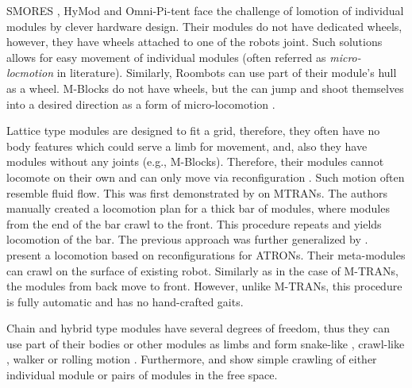 SMORES \cite{DBLP:conf/iros/DaveyKY12}, HyMod \cite{DBLP:conf/dars/ParrottDG16}
and Omni-Pi-tent \cite{DBLP:conf/taros/PeckTT19} face the challenge of lomotion
of individual modules by clever hardware design. Their modules do not have
dedicated wheels, however, they have wheels attached to one of the robots joint.
Such solutions allows for easy movement of individual modules (often referred as
\emph{micro-locmotion} in literature). Similarly, Roombots
\cite{DBLP:conf/icra/SprowitzBDI09} can use part of their module's hull as a
wheel. M-Blocks do not have wheels, but the can jump and shoot themselves into a
desired direction as a form of micro-locomotion
\cite{DBLP:conf/icra/RomanishinGCR15}.

Lattice type modules are designed to fit a grid, therefore, they often have no
body features which could serve a limb for movement, and, also they have modules
without any joints (e.g., M-Blocks). Therefore, their modules cannot locomote on
their own and can only move via reconfiguration \cite{1285597}. Such motion
often resemble fluid flow. This was first demonstrated by
\textcite{DBLP:conf/iros/YoshidaMKTKK01} on MTRANs. The authors manually created
a locomotion plan for a thick bar of modules, where modules from the end of the
bar crawl to the front. This procedure repeats and yields locomotion of the bar.
The previous approach was further generalized by
\textcite{DBLP:conf/icra/ButlerKRT02}.
\textcite{DBLP:conf/ieeealife/Christensen07} present a locomotion based on
reconfigurations for ATRONs. Their meta-modules can crawl on the surface of
existing robot. Similarly as in the case of M-TRANs, the modules from back move
to front. However, unlike M-TRANs, this procedure is fully automatic and has no
hand-crafted gaits.

Chain and hybrid type modules have several degrees of freedom, thus they can use
part of their bodies or other modules as limbs and form snake-like
\cite{DBLP:conf/icra/YimDR00, DBLP:conf/iros/KamimuraMYKTK01,
DBLP:journals/ijrr/KurokawaTKKHM08, DBLP:journals/arobots/JingTYK18}, crawl-like
\cite{DBLP:conf/icra/YimDR00, DBLP:conf/iros/KamimuraMYKTK01,
DBLP:journals/ijrr/KurokawaTKKHM08, DBLP:journals/arobots/JingTYK18}, walker
\cite{DBLP:conf/iros/KamimuraMYKTK01, DBLP:journals/ijrr/KurokawaTKKHM08,
mtranwalker} or rolling motion \cite{DBLP:journals/ijrr/KurokawaTKKHM08,
DBLP:journals/ijrr/SastraCY09, DBLP:journals/arobots/JingTYK18}. Furthermore,
\cite{DBLP:conf/iros/YimSSPDT07a} and \cite{DBLP:journals/ijrr/KurokawaTKKHM08}
show simple crawling of either individual module or pairs of modules in the free
space.

